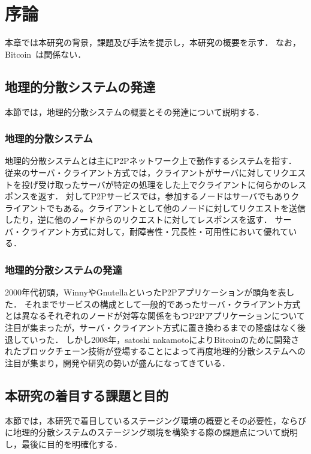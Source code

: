 \chapter{序論}
\label{introduction}

本章では本研究の背景，課題及び手法を提示し，本研究の概要を示す．
なお，Bitcoin~\cite{Bitcoin}は関係ない．

\section{地理的分散システムの発達}
\label{introduction:system-growth}
本節では，地理的分散システムの概要とその発達について説明する．

\subsection{地理的分散システム}
地理的分散システムとは主にP2Pネットワーク上で動作するシステムを指す．
従来のサーバ・クライアント方式では，クライアントがサーバに対してリクエストを投げ受け取ったサーバが特定の処理をした上でクライアントに何らかのレスポンスを返す．
対してP2Pサービスでは，参加するノードはサーバでもありクライアントでもある。クライアントとして他のノードに対してリクエストを送信したり，逆に他のノードからのリクエストに対してレスポンスを返す．
サーバ・クライアント方式に対して，耐障害性・冗長性・可用性において優れている．

\subsection{地理的分散システムの発達}
2000年代初頭，WinnyやGnutellaといったP2Pアプリケーションが頭角を表した．
それまでサービスの構成として一般的であったサーバ・クライアント方式とは異なるそれぞれのノードが対等な関係をもつP2Pアプリケーションについて注目が集まったが，サーバ・クライアント方式に置き換わるまでの隆盛はなく後退していった．
しかし2008年，satoshi nakamotoによりBitcoinのために開発されたブロックチェーン技術が登場することによって再度地理的分散システムへの注目が集まり，開発や研究の勢いが盛んになってきている．

\section{本研究の着目する課題と目的}
\label{introduction:issue-and-aim}
本節では，本研究で着目しているステージング環境の概要とその必要性，ならびに地理的分散システムのステージング環境を構築する際の課題点について説明し，最後に目的を明確化する．

